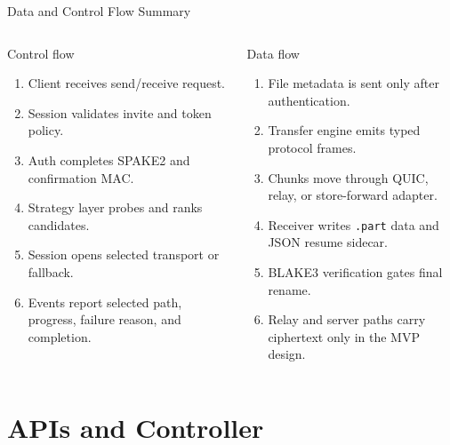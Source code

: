 \documentclass[xcolor=table,dvipsnames,svgnames,aspectratio=169]{beamer}
\newcommand{\tightitems}{\setlength{\itemsep}{0.25em}\setlength{\parskip}{0em}}
\begin{document}
\begin{frame}{Data and Control Flow Summary}
\footnotesize
\begin{columns}[T]
\begin{block}{Control flow}
\begin{enumerate}\tightitems
  \item Client receives send/receive request.
  \item Session validates invite and token policy.
  \item Auth completes SPAKE2 and confirmation MAC.
  \item Strategy layer probes and ranks candidates.
  \item Session opens selected transport or fallback.
  \item Events report selected path, progress, failure reason, and completion.
\end{enumerate}
\end{block}

\begin{block}{Data flow}
\begin{enumerate}\tightitems
  \item File metadata is sent only after authentication.
  \item Transfer engine emits typed protocol frames.
  \item Chunks move through QUIC, relay, or store-forward adapter.
  \item Receiver writes \texttt{.part} data and JSON resume sidecar.
  \item BLAKE3 verification gates final rename.
  \item Relay and server paths carry ciphertext only in the MVP design.
\end{enumerate}
\end{block}
\end{columns}
\end{frame}

\section{APIs and Controller}
\end{document}
